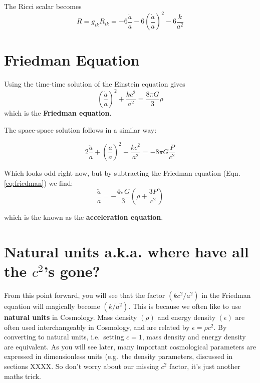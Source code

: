 \documentclass[11pt,a4paper]{book}
\begin{document}
The Ricci scalar becomes
\begin{equation}
R = g_{ik}R_{ik} = - 6\dfrac{\ddot{a}}{a} - 6\left(\dfrac{\dot{a}}{a}\right)^2 - 6\dfrac{k}{a^2}
\label{eq:ric-scal}
\end{equation}

\hypertarget{sec:friedman}{%
\section{Friedman Equation}\label{sec:friedman}}

Using the time-time solution of the Einstein equation gives
\begin{equation}
    \left(\dfrac{\dot{a}}{a}\right)^2 + \dfrac{kc^2}{a^2} = \dfrac{8\pi G}{3}\rho
\label{eq:friedman}
\end{equation}
which is the \textbf{Friedman equation}.

The space-space solution follows in a similar way:

\begin{equation}
2\dfrac{\ddot{a}}{a} + \left(\dfrac{\dot{a}}{a}\right)^2 + \dfrac{kc^2}{a^2} = -8\pi G \dfrac{P}{c^2}
\label{eq:acc-part}
\end{equation}

Which looks odd right now, but by subtracting the Friedman equation (Eqn. \eqref{eq:friedman}) we find:
\begin{equation}
    \dfrac{\ddot{a}}{a} = -\dfrac{4\pi G}{3}\left(\rho + \dfrac{3P}{c^2}\right)
\label{eq:acceleration}
\end{equation}

which is the known as the \textbf{acceleration equation}.

\hypertarget{sec:natural_units}{%
\section{\texorpdfstring{Natural units a.k.a. where have all the \(c^2\)'s gone?}{Natural units a.k.a. where have all the c\^{}2's gone?}}\label{sec:natural_units}}

From this point forward, you will see that the factor
\(\left(k c^2/a^2\right)\) in the Friedman equation will magically become
\(\left(k/a^2\right)\). This is because we often like to use \textbf{natural
units} in Cosmology. Mass density \(\left(\rho\right)\) and energy
density \(\left(\epsilon\right)\) are often used interchangeably in
Cosmology, and are related by \(\epsilon = \rho c^2\). By converting to
natural units, i.e.~setting \(c=1\), mass density and energy density are
equivalent. As you will see later, many important cosmological
parameters are expressed in dimensionless units (e.g.~the density
parameters, discussed in sections XXXX. So don't worry about our missing \(c^2\)
factor, it's just another maths trick.
\end{document}
